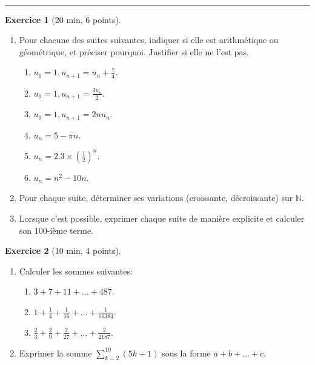 \documentclass{exam}
\theoremstyle{definition}
\newtheorem{exercice}{Exercice}
\begin{document}
\Large



~\\



\medskip\hrule

\begin{exercice}[20 min, 6 points]
    \begin{enumerate}
        \item Pour chacune des suites suivantes, indiquer si elle est arithmétique ou géométrique, et préciser pourquoi. Justifier si elle ne l’est pas.
        \begin{enumerate}
            \item $u_1 = 1, u_{n+1} = u_n + \frac{7}{4}$.
            \item $u_0 = 1, u_{n+1} = \frac{3 u_n}{2}$.
            \item $u_0 = 1, u_{n+1} = 2nu_n$.
            \item $u_n = 5 - \pi n$.
            \item $u_n = 2.3 \times (\frac{1}{2})^n$.
            \item $u_n = n^2 - 10n$.
        \end{enumerate}
        \item Pour chaque suite, déterminer ses variations (croissante, décroissante) sur $\mathbb{N}$.
        \item Lorsque c'est possible, exprimer chaque suite de manière explicite et calculer son $100$-ième terme.
    \end{enumerate}
\end{exercice}

\vfill

\begin{exercice}[10 min, 4 points]
\begin{enumerate}
    \item Calculer les sommes suivantes:
    \begin{enumerate}
        \item $3+7+11+\dots+487$.
        \item $1+\frac{1}{4}+\frac{1}{16}+\dots+\frac{1}{16384}$.
        \item $\frac{2}{3}+\frac{2}{9}+\frac{2}{27}+\dots+\frac{2}{2187}$.
    \end{enumerate}
    \item Exprimer la somme $\sum_{k=2}^{10}(5k+1)$ sous la forme $a+b+\dots+c$.
\end{enumerate}

\vfill
    
\end{exercice}
\end{document}
